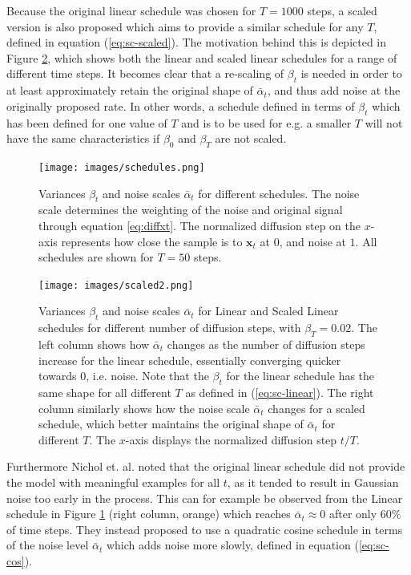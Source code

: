 \documentclass{report}
\begin{document}
Because the original linear schedule was chosen for $T=1000$ steps, a scaled version is also proposed which aims to provide a similar schedule for any $T$, defined in equation (\ref{eq:sc-scaled}). The motivation behind this is depicted in Figure \ref{fig:scaled}, which shows both the linear and scaled linear schedules for a range of different time steps. It becomes clear that a re-scaling of $\beta_t$ is needed in order to at least approximately retain the original shape of $\bar{\alpha}_t$, and thus add noise at the originally proposed rate. In other words, a schedule defined in terms of $\beta_t$ which has been defined for one value of $T$ and is to be used for e.g. a smaller $T$ will not have the same characteristics if $\beta_0$ and $\beta_T$ are not scaled.
\begin{figure}[H]
    \centering
    \texttt{[image: images/schedules.png]}
    \caption{\onehalfspacing Variances $\beta_t$ and noise scales $\bar{\alpha}_t$ for different schedules. The noise scale determines the weighting of the noise and original signal through equation \ref{eq:diffxt}. The normalized diffusion step on the $x$-axis represents how close the sample is to $\bm{x}_t$ at $0$, and noise at $1$. All schedules are shown for $T=50$ steps.}
    \label{fig:schedules}
\end{figure}
\begin{figure}[H]
    \centering
    \texttt{[image: images/scaled2.png]}
    \caption{\onehalfspacing Variances $\beta_t$ and noise scales $\bar{\alpha}_t$ for Linear and Scaled Linear schedules for different number of diffusion steps, with $\beta_T=0.02$. The left column shows how $\bar{\alpha}_t$ changes as the number of diffusion steps increase for the linear schedule, essentially converging quicker towards 0, i.e. noise. Note that the $\beta_t$ for the linear schedule has the same shape for all different $T$ as defined in (\ref{eq:sc-linear}). The right column similarly shows how the noise scale $\bar{\alpha}_t$ changes for a scaled schedule, which better maintains the original shape of $\bar{\alpha}_t$ for different $T$. The $x$-axis displays the normalized diffusion step $t/T$.}
    \label{fig:scaled}
\end{figure}
Furthermore Nichol et. al. \cite{nichol2021improved} noted that the original linear schedule did not provide the model with meaningful examples for all $t$, as it tended to result in Gaussian noise too early in the process. This can for example be observed from the Linear schedule in Figure \ref{fig:schedules} (right column, orange) which reaches $\bar{\alpha}_t \approx 0$ after only 60\% of time steps. They instead proposed to use a quadratic cosine schedule in terms of the noise level $\bar{\alpha}_t$ which adds noise more slowly, defined in equation (\ref{eq:sc-cos}).
\end{document}
